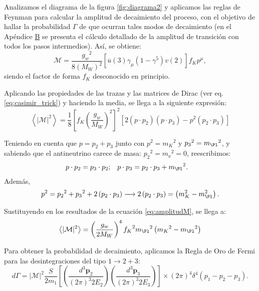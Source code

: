 Analizamos el diagrama de la figura \ref{fig:diagrama2} y aplicamos las reglas de Feynman para calcular la amplitud de decaimiento del proceso, con el objetivo de hallar la probabilidad $\Gamma$ de que ocurran tales modos de decaimiento (en el Apéndice \hyperref[cap:B]{B} se presenta el cálculo detallado de la amplitud de transición con todos los pasos intermedios). Así, se obtiene:
\begin{equation}
\mathcal{M} =\dfrac{{g_{w}}^2}{8\left( M_W\right)^{2}}\left[ \overline{u}\left(3\right) \gamma_{\mu}\left( 1-\gamma^{5} \right) v\left( 2\right) \right] f_K p^{\mu} ,\label{eq:Msimple}
\end{equation}
siendo el factor de forma $f_K$ desconocido en principio.

Aplicando las propiedades de las trazas y las matrices de Dirac (ver eq. \ref{eq:casimir_trick}) y haciendo la media, se llega a la siguiente expresión: 
\begin{equation}
\left\langle |\mathcal{M}|^{2}\right\rangle=\dfrac{1}{8}\left[ f_{K}\left( \dfrac{g_w}{M_W}\right) ^{2}\right] ^{2}\left[2\left( p\cdot p_{2}\right) \left( p\cdot p_{3}\right) -p^{2}\left( p_{2}\cdot p_{3}\right)\right]\label{eq:amplitudM}
\end{equation}

Teniendo en cuenta que $p=p_{2}+p_{3}$ junto con $p^2={m_K}^2$ y ${p_3}^2={m_{\Pl}}^2$, y sabiendo que el antineutrino carece de masa: ${p_2}^2={m_{\nu}}^2=0$, reescribimos:
\begin{align}
p\cdot p_{2} &= p_{3} \cdot p_{2}; & p \cdot p_{3} &= p_{2} \cdot p_{3}+{m_{\Pl}}^2.
\end{align}
Además,
\begin{equation}
p^{2}={p_{2}}^{2}+{p_3}^{2}+2\left( p_{2} \cdot p_{3}\right) \longrightarrow 2\left( p_{2} \cdot p_{3}\right)=\left( m_{K}^{2}-m_{\Pl}^{2}\right).
\end{equation}

Sustituyendo en los resultados de la ecuación \ref{eq:amplitudM}, se llega a:
\begin{equation}
\left\langle |\mathcal{M}|^{2}\right\rangle=\left( \dfrac{g_w}{2M_W}\right)^{4} {f_K}^2 {m_{\Pl}}^{2}\left( {m_{K}}^{2}-{m_{\Pl}}^{2}\right)\label{eq:meanamplitude}
\end{equation}

Para obtener la probabilidad de decaimiento, aplicamos la Regla de Oro de Fermi para las desintegraciones del tipo $ 1 \rightarrow 2+3$:
\begin{equation}
d\Gamma =\left| \mathcal{M}\right| ^{2}\dfrac{S}{2m_{1}}\left[ \left( \dfrac{d^{3}\boldsymbol{p}_{2}}{\left( 2\pi \right) ^{3}2E_{2}}\right) \left( \dfrac{d^{3}\boldsymbol{p}_{3}}{\left( 2\pi \right) ^{3}2E_{3}}\right) \right] \times \left( 2\pi \right) ^{4}\delta ^{4}\left( p_{1}-p_{2}-p_{3}\right) .
\end{equation}

